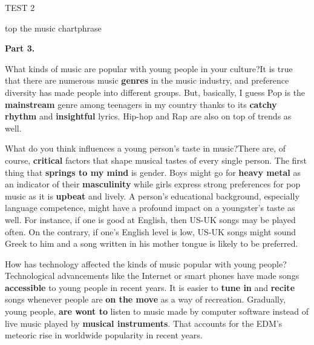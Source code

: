\begin{glossarymc}[Cambridge 5]
\begin{test}{TEST 2}
\begin{VocabExplain}[Part 2]
            \begin{ExplainCard}{top the music chart}{phrase}
            \end{ExplainCard}
        \end{VocabExplain}

    \noindent
    \textbf{Part 3.}
    \begin{qa}{What kinds of music are popular with young people in your culture?}{It is true that there are numerous music \textbf{genres} in the music industry, and preference diversity has made people into different groups. But, basically, I guess Pop is the \textbf{mainstream} genre among teenagers in my country thanks to its \textbf{catchy rhythm} and \textbf{insightful} lyrics. Hip-hop and Rap are also on top of trends as well.}
    \end{qa}

    \begin{qa}{What do you think influences a young person's taste in music?}{There are, of course, \textbf{critical} factors that shape musical tastes of every single person. The first thing that \textbf{springs to my mind} is gender. Boys might go for \textbf{heavy metal} as an indicator of their \textbf{masculinity} while girls express strong preferences for pop music as it is \textbf{upbeat} and lively. A person's educational background, especially language competence, might have a profound impact on a youngster's taste as well. For instance, if one is good at English, then US-UK songs may be played often. On the contrary, if one's English level is low, US-UK songs might sound Greek to him and a song written in his mother tongue is likely to be preferred.}
    \end{qa}

    \begin{qa}{How has technology affected the kinds of music popular with young people?}{Technological advancements like the Internet or smart phones have made songs \textbf{accessible} to young people in recent years. It is easier to \textbf{tune in} and \textbf{recite} songs whenever people are \textbf{on the move} as a way of recreation. Gradually, young people, \textbf{are wont to} listen to music made by computer software instead of live music played by \textbf{musical instruments}. That accounts for the EDM's meteoric rise in worldwide popularity in recent years.}
    \end{qa}


\end{test}
\end{glossarymc}
